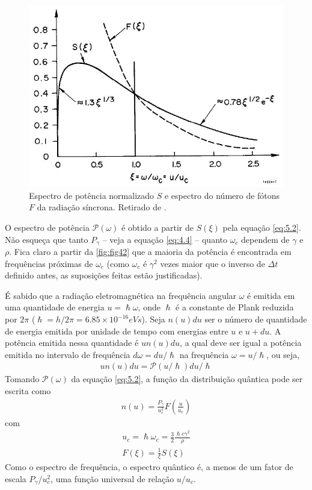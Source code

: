 \begin{figure}[!htb]
	\centering
	\includegraphics[width=0.7\linewidth]{./Figuras/fig42.jpeg}
	\caption{Espectro de potência normalizado $S$ e espectro do número de fótons $F$ da radiação síncrona. Retirado de \cite{sands1970physics}.}
	\label{fig:fig42}
\end{figure}

O espectro de potência $\mathscr{P}(\omega)$ é obtido a partir de $S(\xi)$ pela equação \eqref{eq:5.2}. Não esqueça que tanto $P_\gamma$ -- veja a equação \eqref{eq:4.4} -- quanto $\omega_c$ dependem de $\gamma$ e $\rho$. Fica claro a partir da \autoref{fig:fig42} que a maioria da potência é encontrada em frequências próximas de $\omega_c$ (como $\omega_c$ é $\gamma^2$ vezes maior que o inverso de $\Delta t$ definido antes, as suposições feitas estão justificadas).

É sabido que a radiação eletromagnética na frequência angular $\omega$ é emitida em uma quantidade de energia $u=\hslash \omega$, onde $\hslash$ é a constante de Plank reduzida por $2\pi$ ($\hslash = h/2\pi = 6.85 \times 10^{-16} eVs$). Seja $n(u)du$ ser o número de quantidade de energia emitida por unidade de tempo com energias entre $u$ e $u+du$. A potência emitida nessa quantidade é $u n(u)du$, a qual deve ser igual a potência emitida no intervalo de frequência $d\omega = du/\hslash$ na frequência $\omega = u/\hslash$, ou seja,
\begin{align}
	un(u)du = \mathscr{P}(u/\hslash)du/\hslash
\end{align}
Tomando $\mathscr{P}(\omega)$ da equação \eqref{eq:5.2}, a função da distribuição quântica pode ser escrita como
\begin{align}
	n(u) = \frac{P_\gamma}{u_c^2}F\left(\frac{u}{u_c}\right)
\end{align}
com
\begin{align}
	u_c = \hslash \omega_c = \frac{3}{2}\frac{\hslash c \gamma^2}{\rho}\label{eq:5.9}\\
	F(\xi) = \frac{1}{\xi}S(\xi)
\end{align}
Como o espectro de frequência, o espectro quântico é, a menos de um fator de escala $P_\gamma/u_c^2$, uma função universal de relação $u/u_c$.

